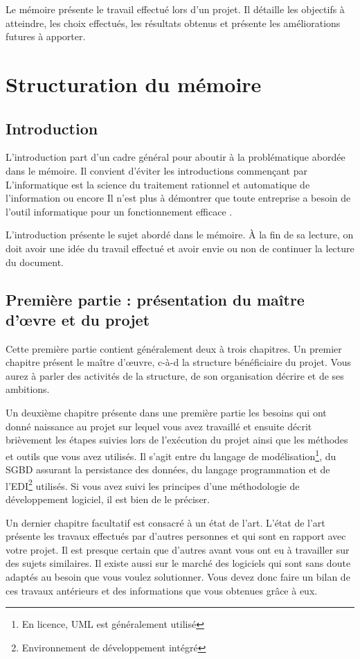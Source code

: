 \documentclass[12pt]{article}
\begin{document}
Le mémoire présente le travail effectué lors d'un projet. Il détaille les objectifs à atteindre, les choix effectués, les résultats obtenus et présente les améliorations futures à apporter.

\section{Structuration du mémoire}

\subsection{Introduction}
L'introduction part d'un cadre général pour aboutir à la problématique abordée dans le mémoire. Il convient d'éviter les introductions commençant par \og L'informatique est la science du traitement rationnel et automatique de l'information \fg{} ou encore \og Il n'est plus à démontrer que toute entreprise a besoin de l'outil informatique pour un fonctionnement efficace \fg{}.

L'introduction présente le sujet abordé dans le mémoire. \`A la fin de sa lecture, on doit avoir une idée du travail effectué et avoir envie ou non de continuer la lecture du document.

\subsection{Première partie : présentation du maître d'\oe{}vre et du projet}
Cette première partie contient généralement deux à trois chapitres. Un premier chapitre présent le maître d'\oe{}uvre, c-à-d la structure bénéficiaire du projet. Vous aurez à parler des activités de la structure, de son organisation décrire et de ses ambitions.

Un deuxième chapitre présente dans une première partie les besoins qui ont donné naissance au projet sur lequel vous avez travaillé et ensuite décrit brièvement les étapes suivies lors de l'exécution du projet ainsi que les méthodes et outils que vous avez utilisés. Il s'agit entre du langage de modélisation\footnote{En licence, UML est généralement utilisé}, du SGBD assurant la persistance des données, du langage programmation et de l'EDI\footnote{Environnement de développement intégré} utilisés. Si vous avez suivi les principes d'une méthodologie de développement logiciel, il est bien de le préciser.

Un dernier chapitre facultatif est consacré à un état de l'art. L'état de l'art présente les travaux effectués par d'autres personnes et qui sont en rapport avec votre projet. Il est presque certain que d'autres avant vous ont eu à travailler sur des sujets similaires. Il existe aussi sur le marché des logiciels qui sont sans doute adaptés au besoin que vous voulez solutionner. Vous devez donc faire un bilan de ces travaux antérieurs et des informations que vous obtenues grâce à eux.
\end{document}
